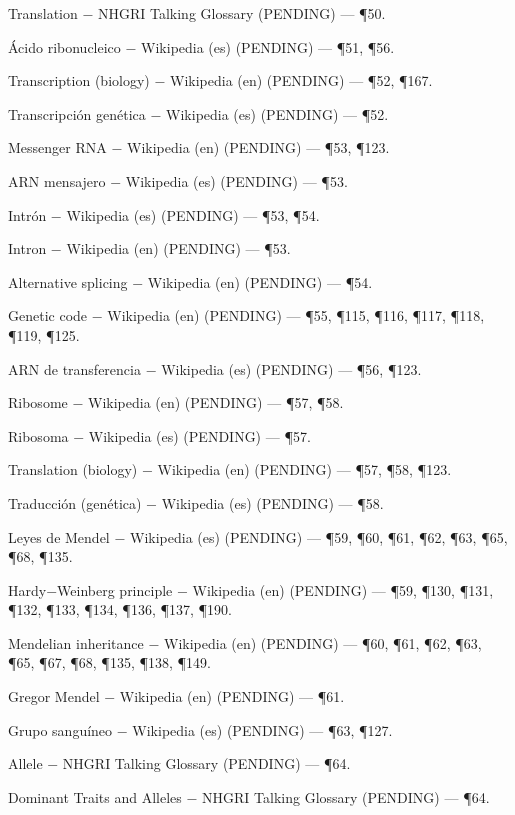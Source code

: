 \documentclass{book}
\begin{document}
\noindent Translation \(-\) NHGRI Talking Glossary (PENDING) --- \P50.

\noindent Ácido ribonucleico \(-\) Wikipedia (es) (PENDING) --- \P51, \P56.

\noindent Transcription (biology) \(-\) Wikipedia (en) (PENDING) --- \P52, \P167.

\noindent Transcripción genética \(-\) Wikipedia (es) (PENDING) --- \P52.

\noindent Messenger RNA \(-\) Wikipedia (en) (PENDING) --- \P53, \P123.

\noindent ARN mensajero \(-\) Wikipedia (es) (PENDING) --- \P53.

\noindent Intrón \(-\) Wikipedia (es) (PENDING) --- \P53, \P54.

\noindent Intron \(-\) Wikipedia (en) (PENDING) --- \P53.

\noindent Alternative splicing \(-\) Wikipedia (en) (PENDING) --- \P54.

\noindent Genetic code \(-\) Wikipedia (en) (PENDING) --- \P55, \P115, \P116, \P117, \P118, \P119, \P125.

\noindent ARN de transferencia \(-\) Wikipedia (es) (PENDING) --- \P56, \P123.

\noindent Ribosome \(-\) Wikipedia (en) (PENDING) --- \P57, \P58.

\noindent Ribosoma \(-\) Wikipedia (es) (PENDING) --- \P57.

\noindent Translation (biology) \(-\) Wikipedia (en) (PENDING) --- \P57, \P58, \P123.

\noindent Traducción (genética) \(-\) Wikipedia (es) (PENDING) --- \P58.

\noindent Leyes de Mendel \(-\) Wikipedia (es) (PENDING) --- \P59, \P60, \P61, \P62, \P63, \P65, \P68, \P135.

\noindent Hardy\(-\)Weinberg principle \(-\) Wikipedia (en) (PENDING) --- \P59, \P130, \P131, \P132, \P133, \P134, \P136, \P137, \P190.

\noindent Mendelian inheritance \(-\) Wikipedia (en) (PENDING) --- \P60, \P61, \P62, \P63, \P65, \P67, \P68, \P135, \P138, \P149.

\noindent Gregor Mendel \(-\) Wikipedia (en) (PENDING) --- \P61.

\noindent Grupo sanguíneo \(-\) Wikipedia (es) (PENDING) --- \P63, \P127.

\noindent Allele \(-\) NHGRI Talking Glossary (PENDING) --- \P64.

\noindent Dominant Traits and Alleles \(-\) NHGRI Talking Glossary (PENDING) --- \P64.
\end{document}

